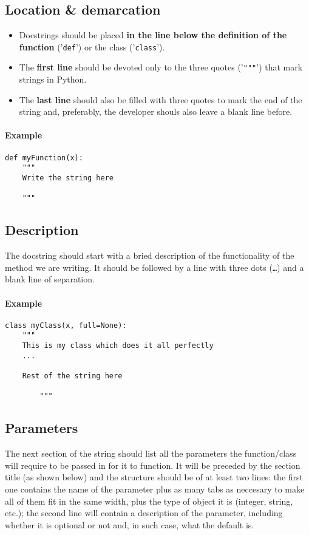 \documentclass{article}
\begin{document}
\subsection{Location \& demarcation}
\begin{itemize}
    \item Docstrings should be placed \textbf{in the line below the definition
        of the function} ('\texttt{def}') or the class ('\texttt{class}').
    \item The \textbf{first line} should be devoted only to the three quotes
        ('\texttt{"""}') that mark strings in Python.
    \item The \textbf{last line} should also be filled with three quotes to
        mark the end of the string and, preferably, the developer shouls also
        leave a blank line before.
\end{itemize}

\paragraph{Example}

\begin{verbatim}
def myFunction(x):
    """
    Write the string here

    """
\end{verbatim}

\subsection{Description}
The docstring should start with a bried description of the functionality of
the method we are writing. It should be followed by a line with three dots
(\texttt{\dots}) and a blank line of separation.

\paragraph{Example}

\begin{verbatim}
class myClass(x, full=None):
    """
    This is my class which does it all perfectly
    ...

    Rest of the string here

        """
\end{verbatim}

\subsection{Parameters}
The next section of the string should list all the parameters the
function/class will require to be passed in for it to function. It will be
preceded by the section title (as shown below) and the structure
should be of at least two lines: the first one contains the name of the
parameter plus as many tabs as neccesary to make all of them fit in the same
width, plus the type of object it is (integer, string, etc.); the second line
will contain a description of the parameter, including whether it is optional
or not and, in such case, what the default is.
\end{document}
